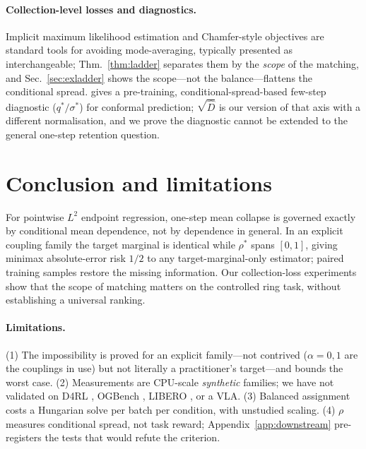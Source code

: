 \documentclass{article}
\theoremstyle{plain}
\newcommand{\cD}{\hat D}
\begin{document}
\paragraph{Collection-level losses and diagnostics.} Implicit maximum likelihood estimation
\citep{li2018imle} and Chamfer-style objectives are standard tools for avoiding
mode-averaging, typically presented as interchangeable; Thm.~\ref{thm:ladder} separates
them by the \emph{scope} of the matching, and Sec.~\ref{sec:exladder} shows the scope---not
the balance---flattens the conditional spread. \citep{li2026nofreelunch} gives a
pre-training, conditional-spread-based few-step diagnostic ($q^\ast/\sigma^\ast$) for
conformal prediction; $\sqrt{\cD}$ is our version of that axis with a different
normalisation, and we prove the diagnostic cannot be extended to the general one-step
retention question.

\section{Conclusion and limitations}
\label{sec:conclusion}

For pointwise $L^2$ endpoint regression, one-step mean collapse is governed exactly by
conditional mean dependence, not by dependence in general. In an explicit coupling family
the target marginal is identical while $\rho^\ast$ spans $[0,1]$, giving minimax
absolute-error risk $1/2$ to any target-marginal-only estimator; paired training samples
restore the missing information. Our collection-loss experiments show that the scope of matching matters on the controlled ring task, without
establishing a universal ranking.

\paragraph{Limitations.} (1) The impossibility is proved for an explicit family---not
contrived ($\alpha=0,1$ are the couplings in use) but not literally a practitioner's
target---and bounds the worst case. (2) Measurements are CPU-scale \emph{synthetic}
families; we have not validated on D4RL \citep{fu2020d4rl}, OGBench
\citep{park2025ogbench}, LIBERO \citep{liu2023libero}, or a VLA. (3) Balanced assignment
costs a Hungarian solve per batch per condition, with unstudied scaling. (4) $\rho$
measures conditional spread, not task reward; Appendix~\ref{app:downstream} pre-registers
the tests that would refute the criterion.
\end{document}
